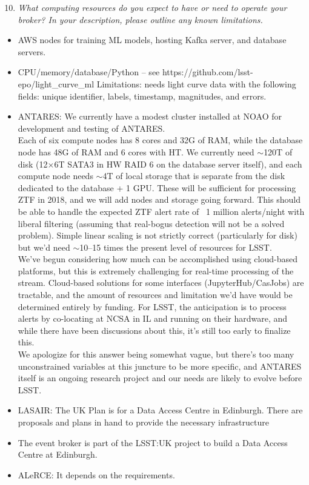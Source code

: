 \documentclass{article}
\begin{document}
\begin{enumerate}
\setcounter{enumi}{9}
\item {\em What computing resources do you expect to have or need to operate your broker? In your description, please outline any known limitations. }
\end{enumerate}

\begin{itemize}
\item AWS nodes for training ML models, hosting Kafka server, and database servers.
\item CPU/memory/database/Python – see https://github.com/lsst-epo/light\_curve\_ml   Limitations: needs light curve data with the following fields: unique identifier, labels, timestamp, magnitudes, and errors.

\item ANTARES: We currently have a modest cluster installed at NOAO for development and testing of ANTARES. \\
Each of six compute nodes has 8 cores and 32G of RAM, while the database node has 48G of RAM and 6 cores with HT.  We currently need $\sim$120T of disk (12$\times$6T SATA3 in HW RAID 6 on the database server itself), and each compute node needs $\sim$4T of local storage that is separate from the disk dedicated to the database + 1 GPU. These will be sufficient for processing ZTF in 2018, and we will add nodes and storage going forward. This should be able to handle the expected ZTF alert rate of ~1 million alerts/night with liberal filtering (assuming that real-bogus detection will not be a solved problem). Simple linear scaling is not strictly correct (particularly for disk) but we’d need $\sim$10--15 times the present level of resources for LSST. \\
We’ve begun considering how much can be accomplished using cloud-based platforms, but this is extremely challenging for real-time processing of the stream. Cloud-based solutions for some interfaces (JupyterHub/CasJobs) are tractable, and the amount of resources and limitation we’d have would be determined entirely by funding. For LSST, the anticipation is to process alerts by co-locating at NCSA in IL and running on their hardware, and while there have been discussions about this, it’s still too early to finalize this. \\
We apologize for this answer being somewhat vague, but there’s too many unconstrained variables at this juncture to be more specific, and ANTARES itself is an ongoing research project and our needs are likely to evolve before LSST.
\item LASAIR: The UK Plan is for a Data Access Centre in Edinburgh. There are proposals and plans in hand to provide the necessary infrastructure 
\item The event broker is part of the LSST:UK project to build a Data Access Centre at Edinburgh.
\item ALeRCE: It depends on the requirements.
\end{itemize}
\end{document}
